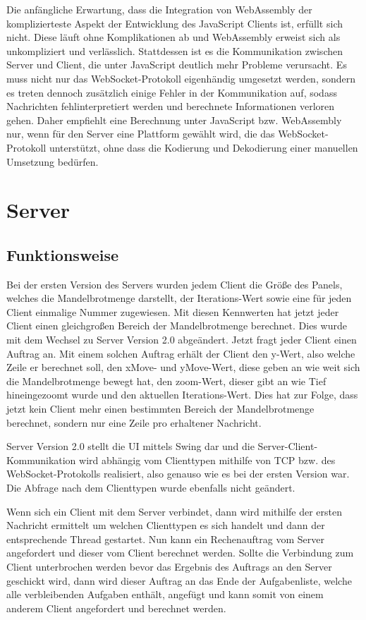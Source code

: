 \documentclass[12pt, onecolumn, notitlepage]{scrartcl}
\begin{document}
Die anfängliche Erwartung, dass die Integration von WebAssembly der komplizierteste Aspekt der Entwicklung des JavaScript Clients ist, erfüllt sich nicht. Diese läuft ohne Komplikationen ab und WebAssembly erweist sich als unkompliziert und verlässlich. Stattdessen ist es die Kommunikation zwischen Server und Client, die unter JavaScript deutlich mehr Probleme verursacht. Es muss nicht nur das WebSocket-Protokoll eigenhändig umgesetzt werden, sondern es treten dennoch zusätzlich einige Fehler in der Kommunikation auf, sodass Nachrichten fehlinterpretiert werden und berechnete Informationen verloren gehen. Daher empfiehlt eine Berechnung unter JavaScript bzw. WebAssembly nur, wenn für den Server eine Plattform gewählt wird, die das WebSocket-Protokoll unterstützt, ohne dass die Kodierung und Dekodierung einer manuellen Umsetzung bedürfen.


\section{Server}
\subsection{Funktionsweise}
Bei der ersten Version des Servers wurden jedem Client die Größe des Panels, welches die Mandelbrotmenge darstellt, der Iterations-Wert sowie eine für jeden Client einmalige Nummer zugewiesen. Mit diesen Kennwerten hat jetzt jeder Client einen gleichgroßen Bereich der Mandelbrotmenge berechnet. Dies wurde mit dem Wechsel zu Server Version 2.0 abgeändert. Jetzt fragt jeder Client einen Auftrag an. Mit einem solchen Auftrag erhält der Client den y-Wert, also welche Zeile er berechnet soll, den xMove- und yMove-Wert, diese geben an wie weit sich die Mandelbrotmenge bewegt hat, den zoom-Wert, dieser gibt an wie Tief hineingezoomt wurde und den aktuellen Iterations-Wert. Dies hat zur Folge, dass jetzt kein Client mehr einen bestimmten Bereich der Mandelbrotmenge berechnet, sondern nur eine Zeile pro erhaltener Nachricht. \par
Server Version 2.0 stellt die UI mittels Swing dar und die Server-Client-Kommunikation wird abhängig vom Clienttypen mithilfe von TCP bzw. des WebSocket-Protokolls realisiert, also genauso wie es bei der ersten Version war. Die Abfrage nach dem Clienttypen wurde ebenfalls nicht geändert. \par
Wenn sich ein Client mit dem Server verbindet, dann wird mithilfe der ersten Nachricht ermittelt um welchen Clienttypen es sich handelt und dann der entsprechende Thread gestartet. Nun kann ein Rechenauftrag vom Server angefordert und dieser vom Client berechnet werden. Sollte die Verbindung zum Client unterbrochen werden bevor das Ergebnis des Auftrags an den Server geschickt wird, dann wird dieser Auftrag an das Ende der Aufgabenliste, welche alle verbleibenden Aufgaben enthält, angefügt und kann somit von einem anderem Client angefordert und berechnet werden.
\end{document}
